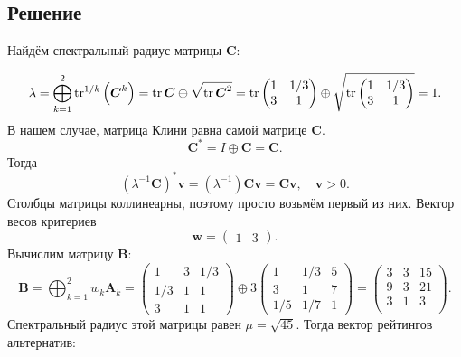 \documentclass[specialist,
	substylefile = spbu_report.rtx,
	subf,href,colorlinks=true, 12pt]{disser}
\begin{document}
\subsection{Решение}
Найдём спектральный радиус матрицы \(\boldsymbol{C}\):

\[
	\lambda=\bigoplus_{k=1}^{2} \operatorname{tr}^{1 / k}\left(\boldsymbol{C}^{k}\right) = \operatorname{tr}\boldsymbol{C} \oplus \sqrt{\operatorname{tr}\boldsymbol{C}^2} =
	\operatorname{tr}\begin{pmatrix}1&1/3\\3&1\end{pmatrix} \oplus \sqrt{\operatorname{tr}\begin{pmatrix}1&1/3\\3&1\end{pmatrix}} = 1.
\]
В нашем случае, матрица Клини равна самой матрице \(\boldsymbol{C}\).
\[
	\boldsymbol{C}^* = I \oplus \boldsymbol{C} = \boldsymbol{C}.
\]
Тогда
\[
	(\lambda^{-1}\boldsymbol{C})^*\boldsymbol{v} = (\lambda^{-1})\boldsymbol{C}\boldsymbol{v} = \boldsymbol{C}\boldsymbol{v}, \quad \boldsymbol{v} > 0.
\]
Столбцы матрицы коллинеарны, поэтому просто возьмём первый из них. Вектор весов критериев
\[
	\boldsymbol{w} = \begin{pmatrix}1 & 3\end{pmatrix}.
\]
Вычислим матрицу \(\boldsymbol{B}\):
\[
	\boldsymbol{B}=\bigoplus_{k=1}^{2} w_{k} \boldsymbol{A}_{k} = \begin{pmatrix}1&3&1/3\\1/3&1&1\\3&1&1\end{pmatrix} \oplus 3\begin{pmatrix}1&1/3&5\\3&1&7\\1/5&1/7&1\end{pmatrix} = \begin{pmatrix}3&3&15\\ 9&3&21\\ 3&1&3\\\end{pmatrix}.
\]
Спектральный радиус этой матрицы равен \(\mu = \sqrt{45}\).
Тогда вектор рейтингов альтернатив:
\end{document}
